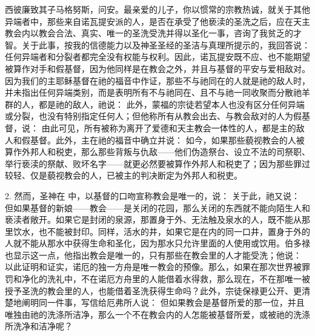 \par

西彼廉致其子马格努斯，问安。最亲爱的儿子，你以惯常的宗教热诚，就关于其他异端者中，那些来自诺瓦提安派的人，是否在承受了他亵渎的圣洗之后，应在天主教会内以教会合法、真实、唯一的圣洗受洗并得以圣化一事，咨询了我贫乏的才智。关于此事，按我的信德能力以及神圣圣经的圣洁与真理所提示的，我回答说：任何异端者和分裂者都完全没有权能与权利。因此，诺瓦提安既不应、也不能期望被算作对手和假基督，因为他同样是在教会之外，并且与基督的平安与爱相敌对。因为我们的主耶稣基督在祂的福音中作证，那些不与祂同在的人就是祂的敌人时，并未指出任何异端类别，而是表明所有不与祂同在、且不与祂一同收聚而分散祂羊群的人，都是祂的敌人，祂说： 此外，蒙福的宗徒若望本人也没有区分任何异端或分裂，也没有特别指定任何人；但他称所有从教会出去、与教会敌对的人为假基督，说：  由此可见，所有被称为离开了爱德和天主教会一体性的人，都是主的敌人和假基督。此外，主在祂的福音中确立并说：  如今，如果那些藐视教会的人被算作外邦人和税吏，那么那些背叛与仇敌——他们伪造祭台、设立不法的司祭职、举行亵渎的祭献、败坏名字——就更必然要被算作外邦人和税吏了；因为那些罪过较轻、仅是藐视教会的人，已被主的判决断定为外邦人和税吏。\par

2. 然而，圣神在  中，以基督的口吻宣称教会是唯一的，说：  关于此，祂又说：  但如果基督的新娘——教会——是关闭的花园，那么关闭的东西就不能向陌生人和亵渎者敞开。如果它是封闭的泉源，那置身于外、无法触及泉水的人，既不能从那里饮水，也不能被封印。同样，活水的井，如果它是在内的同一口井，置身于外的人就不能从那水中获得生命和圣化，因为那水只允许里面的人使用或饮用。伯多禄也显示这一点，他指出教会是唯一的，只有那些在教会里的人才能受洗；他说：  以此证明和证实，诺厄的独一方舟是唯一教会的预像。那么，如果在那次世界被罪罚和净化的洗礼中，不在诺厄方舟里的人能借着水得救，那么现在，不在那唯一被授予圣洗的教会里的人，也能借着圣洗获得生命吗？此外，宗徒保禄更公开、更清楚地阐明同一件事，写信给厄弗所人说： 但如果教会是基督所爱的那一位，并且唯独由祂的洗涤所洁净，那么一个不在教会内的人怎能被基督所爱，或被祂的洗涤所洗净和洁净呢？\par

